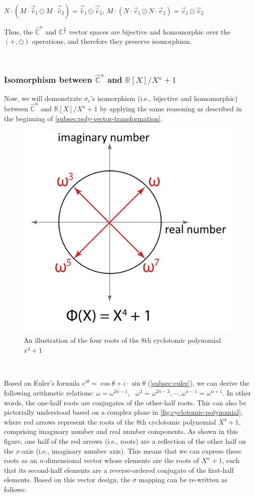 $N\cdot (M\cdot\vec{\hat v}_1 \odot M\cdot\vec{\hat v}_2) = \vec{\hat v}_1 \odot \vec{\hat v}_2$, \text{ } $M\cdot (N\cdot\vec{v}_1 \odot N\cdot\vec{v}_2) = \vec{v}_1 \odot \vec{v}_2$

Thus, the $\mathbb{\hat C}^n$ and $\mathbb{C}^{\frac{n}{2}}$ vector spaces are bijective and homomorphic over the $(+, \odot)$ operations, and therefore they preserve isomorphism. 

$ $


\subsubsection{Isomorphism between $\mathbb{\hat C}^{n}$ and $\mathbb{R}[X] / X^n + 1$}
\label{subsec:poly-vector-transformation-complex-isomorphism2}


Now, we will demonstrate $\sigma_c$'s isomorphism (i.e., bijective and homomorphic) between $\mathbb{\hat C}^{n}$ and $\mathbb{R}[X] / X^n + 1$ by applying the same reasoning as described in the beginning of \autoref{subsec:poly-vector-transformation}. 

\begin{figure}[h!]
    \centering
  \includegraphics[width=0.3\linewidth]{figures/cyclotomic-polynomial.pdf}
  \caption{An illustration of the four roots of the 8th cyclotomic polynomial $x^4 + 1$ 
  }
  \label{fig:cyclotomic-polynomial}
\end{figure}

$ $

 Based on Euler's formula $e^{i\theta} = \cos\theta + i\cdot\sin\theta$ (\autoref{subsec:euler}), we can derive the following arithmetic relations: $\omega = \overline{\omega^{2n-1}}, \text{ } \omega^3 = \overline{\omega^{2n-3}}, \cdots, \omega^{n-1} = \overline{\omega^{n+1}}$. In other words, the one-half roots are conjugates of the other-half roots. This can also be pictorially understood based on a complex plane in \autoref{fig:cyclotomic-polynomial}, where red arrows represent the roots of the 8th cyclotomic polynomial $X^4 + 1$, comprising imaginary number and real number components. As shown in this figure, one half of the red arrows (i.e., roots) are a reflection of the other half on the $x$-axis (i.e., imaginary number axis). This means that we can express these roots as an $n$-dimensional vector whose elements are the roots of $X^n + 1$, such that its second-half elements are a reverse-ordered conjugate of the first-half elements. Based on this vector design, the $\sigma$ mapping can be re-written as follows:

